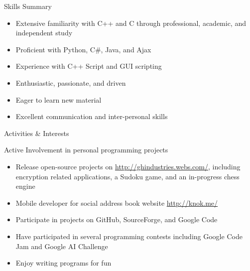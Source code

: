 \documentclass[11pt]{article}
\begin{document}
    \begin{section}{Skills Summary}

        \begin{itemize}
            \item Extensive familiarity with C++ and C through professional, academic, and independent study
            \item Proficient with Python, C\#, Java, and Ajax
            \item Experience with C++ Script and GUI scripting
            \item Enthusiastic, passionate, and driven
            \item Eager to learn new material
            \item Excellent communication and inter-personal skills
        \end{itemize}

    \end{section}
    \begin{section}{Activities \& Interests}

        \begin{bf}Active Involvement in personal programming projects\end{bf}

        \begin{itemize}
            \item Release open-source projects on \href{http://ghindustries.webs.com/}{http://ghindustries.webs.com/}, including encryption related applications, a Sudoku game, and an in-progress chess engine
            \item Mobile developer for social address book website \href{http://knok.me/}{http://knok.me/}
            \item Participate in projects on GitHub, SourceForge, and Google Code
            \item Have participated in several programming contests including Google Code Jam and Google AI Challenge
            \item Enjoy writing programs for fun
        \end{itemize}

    \end{section}
\end{document}
